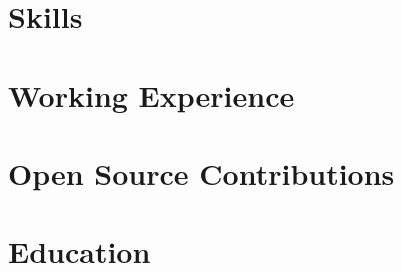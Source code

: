 \documentclass[letter,10pt]{article}
\begin{document}


\section{Skills}

\section{Working Experience}


\section{Open Source Contributions}

\section{Education}


\end{document}
